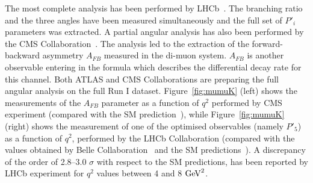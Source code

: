 The most complete analysis has been performed by LHCb~\cite{mumuK_LHCb}. The branching ratio and the three angles have been measured simultaneously and the full set of $P'_i$ parameters was extracted. A partial angular analysis has also been performed by the CMS Collaboration~\cite{mumuK_CMS}. The analysis led to the extraction of the forward-backward asymmetry $A_{FB}$  measured in the di-muon system. $A_{FB}$ is another observable entering in the formula which describes the differential decay rate for this channel. Both ATLAS and CMS Collaborations are preparing the full angular analysis on the full Run I dataset.  Figure~\ref{fig:mumuK} (left) shows the measurements of the $A_{FB}$ parameter as a function of $q^2$ performed by CMS experiment (compared with the SM prediction~\cite{ABSZ}), while Figure~\ref{fig:mumuK} (right) shows the measurement of one of the optimised observables (namely $P'_5$) as a function of $q^2$,  performed by the LHCb Collaboration (compared with the values obtained by Belle Collaboration~\cite{Belle} and the SM predictions~\cite{DHMV}). A discrepancy of the order of 2.8--3.0 $\sigma$ with respect to the SM predictions, has been reported by LHCb experiment for $q^2$ values between 4 and 8 ${\rm{GeV}}^2$.

